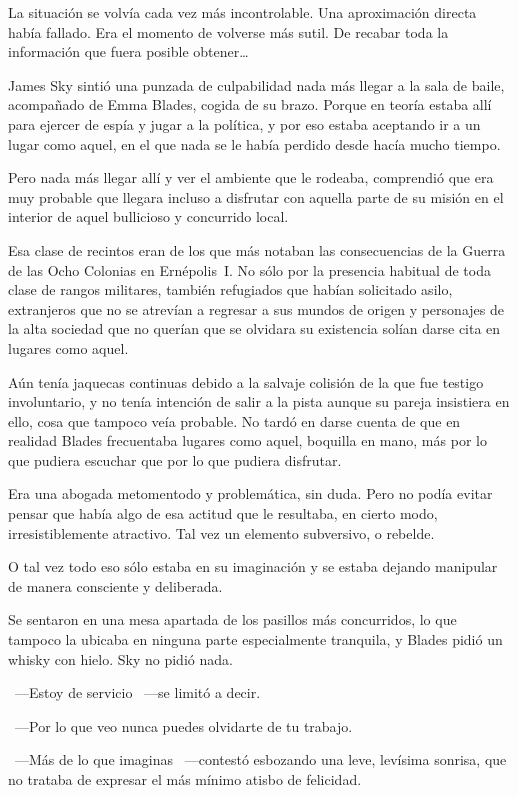 La situación se volvía cada vez más incontrolable. Una aproximación directa había fallado. Era el momento de volverse más sutil. De recabar toda la información que fuera posible obtener\dots

\fancyparbreak
James Sky sintió una punzada de culpabilidad nada más llegar a la sala de baile, acompañado de Emma Blades, cogida de su brazo. Porque en teoría estaba allí para ejercer de espía y jugar a la política, y por eso estaba aceptando ir a un lugar como aquel, en el que nada se le había perdido desde hacía mucho tiempo.

Pero nada más llegar allí y ver el ambiente que le rodeaba, comprendió que era muy probable que llegara incluso a disfrutar con aquella parte de su misión en el interior de aquel bullicioso y concurrido local.

Esa clase de recintos eran de los que más notaban las consecuencias de la Guerra de las Ocho Colonias en Ernépolis~I. No sólo por la presencia habitual de toda clase de rangos militares, también refugiados que habían solicitado asilo, extranjeros que no se atrevían a regresar a sus mundos de origen y personajes de la alta sociedad que no querían que se olvidara su existencia solían darse cita en lugares como aquel.

Aún tenía jaquecas continuas debido a la salvaje colisión de la que fue testigo involuntario, y no tenía intención de salir a la pista aunque su pareja insistiera en ello, cosa que tampoco veía probable. No tardó en darse cuenta de que en realidad Blades frecuentaba lugares como aquel, boquilla en mano, más por lo que pudiera escuchar que por lo que pudiera disfrutar.

Era una abogada metomentodo y problemática, sin duda. Pero no podía evitar pensar que había algo de esa actitud que le resultaba, en cierto modo, irresistiblemente atractivo. Tal vez un elemento subversivo, o rebelde.

O tal vez todo eso sólo estaba en su imaginación y se estaba dejando manipular de manera consciente y deliberada.

Se sentaron en una mesa apartada de los pasillos más concurridos, lo que tampoco la ubicaba en ninguna parte especialmente tranquila, y Blades pidió un whisky con hielo. Sky no pidió nada.

~---Estoy de servicio ~---se limitó a decir.

~---Por lo que veo nunca puedes olvidarte de tu trabajo.

~---Más de lo que imaginas ~---contestó esbozando una leve, levísima sonrisa, que no trataba de expresar el más mínimo atisbo de felicidad.

